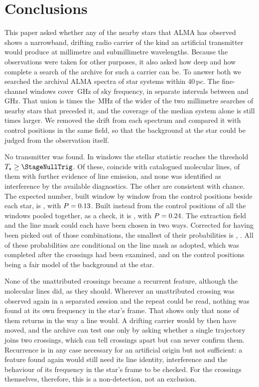 \section{Conclusions}
\label{sec:conclusions}

This paper asked whether any of the nearby stars that ALMA has observed shows
a narrowband, drifting radio carrier of the kind an artificial transmitter
would produce at millimetre and submillimetre wavelengths. Because the
observations were taken for other purposes, it also asked how deep and how
complete a search of the archive for such a carrier can be. To answer both
we searched the archival ALMA spectra of \NSysClassA{} star systems within
40\,pc. The fine-channel windows cover \CvUnionA\,GHz of sky frequency, in
\CovNIslands{} separate intervals between \SurvFreqLoA{} and
\SurvFreqHiA\,GHz. That union is \SbPriorRatio{} times the \SbPriorBandMHz\,MHz of the
wider of the two millimetre searches of nearby stars that preceded it, and
the coverage of the median system alone is still \SbPriorRatioSysMed{}
times larger. We removed the drift from each spectrum and compared it with
control positions in the same field, so that the background at the star
could be judged from the observation itself.

No transmitter was found. In \CsNCross{} windows the stellar statistic reaches
the threshold $T_\star\geq\StageNullTrig$. Of these, \MkNCoinc{} coincide with
catalogued molecular lines, \LnAttrSupp{} of them with further evidence of
line emission, and none was identified as interference by the available
diagnostics. The other \CeObs{} are consistent with chance. The expected number, built
window by window from the control positions beside each star, is \CeExp, with
$P=0.13$. Built instead from the control positions of all the windows
pooled together, as a check, it is \CeExpPool, with $P=0.24$. The extraction field and the line
mask could each have been chosen in two ways. Corrected for having been
picked out of those \CgNTrialWord{} combinations, the smallest of their
probabilities is \CgBonfPhrase, \CgVerdictClause. All of these probabilities are conditional on the line
mask as adopted, which was completed
after the crossings had been examined, and on the control positions being a
fair model of the background at the star.

None of the unattributed crossings became a recurrent feature, although
the molecular lines did, as they should. Wherever an unattributed
crossing was observed again in a separated session and the repeat could be
read, nothing was found at its own frequency in the star's frame. That shows
only that none of them returns in the way a line would. A drifting carrier
would by then have moved, and the archive can test one only by asking
whether a single trajectory joins two crossings, which can tell crossings
apart but can never confirm them. Recurrence is in any case necessary for an
artificial origin but not sufficient: a feature found again would still need
its line identity, interference and the behaviour of its frequency in the
star's frame to be checked. For the crossings themselves, therefore,
this is a non-detection, not an exclusion.

